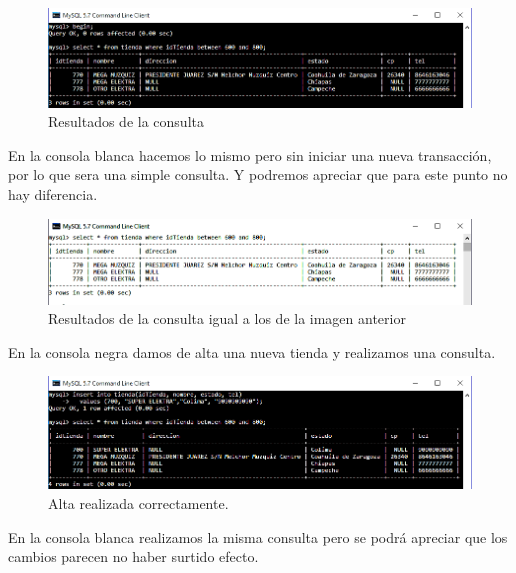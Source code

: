 \documentclass[12pt, titlepage]{article}
\begin{document}
	\begin{figure}[H]
		\begin{center}
			\includegraphics[width=\textwidth]{img/seis.png}
			\caption{Resultados de la consulta}
			\label{fig:seis}
		\end{center}
	\end{figure}

	En la consola blanca hacemos lo mismo pero sin iniciar una nueva transacción, por lo que sera una simple consulta. Y podremos apreciar que para este punto no hay diferencia.
	
	\begin{figure}[H]
		\begin{center}
			\includegraphics[width=\textwidth]{img/siete.png}
			\caption{Resultados de la consulta igual a los de la imagen anterior}
			\label{fig:siete}
		\end{center}
	\end{figure}

	En la consola negra damos de alta una nueva tienda y realizamos una consulta.
	
	\begin{figure}[H]
		\begin{center}
			\includegraphics[width=\textwidth]{img/ocho.png}
			\caption{Alta realizada correctamente.}
			\label{fig:ocho}
		\end{center}
	\end{figure}

	En la consola blanca realizamos la misma consulta pero se podrá apreciar que los cambios parecen no haber surtido efecto.
	
\end{document}
